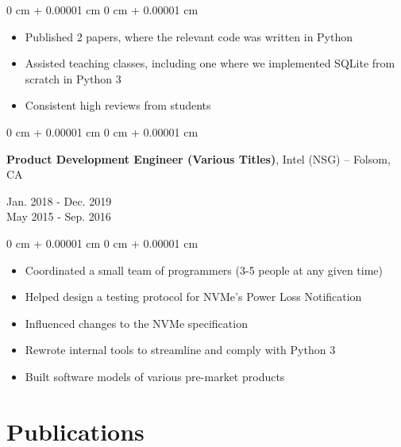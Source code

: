 \documentclass[10pt, letterpaper]{article}
\newenvironment{highlights}{
    \begin{itemize}[
        topsep=0.10 cm,
        parsep=0.10 cm,
        partopsep=0pt,
        itemsep=0pt,
        leftmargin=0 cm + 10pt
    ]
}{
    \end{itemize}
} %
\newenvironment{onecolentry}{
    \begin{adjustwidth}{
        0 cm + 0.00001 cm
    }{
        0 cm + 0.00001 cm
    }
}{
    \end{adjustwidth}
} %
\newenvironment{twocolentry}[2][]{
    \onecolentry
    \def\secondColumn{#2}
    \setcolumnwidth{\fill, 4.5 cm}
    \begin{paracol}{2}
}{
    \switchcolumn \raggedleft \secondColumn
    \end{paracol}
    \endonecolentry
} %
\begin{document}
        \vspace{0.10 cm}
        \begin{onecolentry}
            \begin{highlights}
                \item Published 2 papers, where the relevant code was written in Python
                \item Assisted teaching classes, including one where we implemented SQLite from scratch in Python 3
                \item Consistent high reviews from students
            \end{highlights}
        \end{onecolentry}

        \vspace{0.1 cm}

        \begin{twocolentry}{
            Jan. 2018 - Dec. 2019 \\
            May 2015 - Sep. 2016
        }
            \textbf{Product Development Engineer (Various Titles)}, Intel (NSG) -- Folsom, CA
        \end{twocolentry}

        \vspace{-0.35 cm}
        \begin{onecolentry}
            \begin{highlights}
                \item Coordinated a small team of programmers (3-5 people at any given time)
                \item Helped design a testing protocol for NVMe's Power Loss Notification
                \item Influenced changes to the NVMe specification
                \item Rewrote internal tools to streamline and comply with Python 3
                \item Built software models of various pre-market products
            \end{highlights}
        \end{onecolentry}

    \vspace{-5pt}

    \section{Publications}
\end{document}
